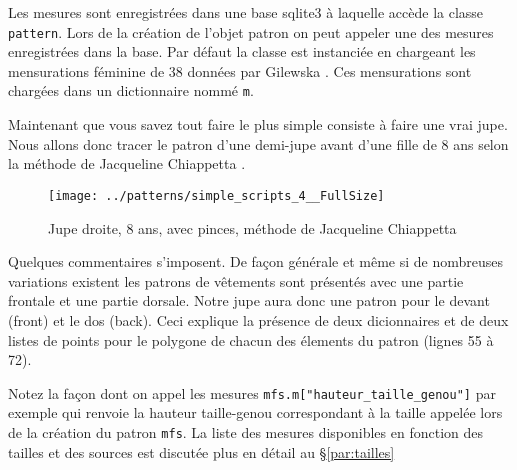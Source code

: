 \documentclass[10pt,a4paper,twoside]{report}
\begin{document}
Les mesures sont enregistrées dans une base sqlite3 à laquelle accède la classe \texttt{pattern}. Lors de la création de l'objet patron on peut appeler une des mesures enregistrées dans la base. Par défaut la classe est instanciée en chargeant les mensurations féminine de 38 données par Gilewska \cite{Gilewska1}. Ces mensurations sont chargées dans un dictionnaire nommé \texttt{m}.

Maintenant que vous savez tout faire le plus simple consiste à faire une vrai jupe. Nous allons donc tracer le patron d'une demi-jupe avant d'une fille de 8 ans selon la méthode de Jacqueline Chiappetta \cite{Chiappetta1999}.




\begin{figure}[tb]
\begin{center}
\texttt{[image: ../patterns/simple\_scripts\_4\_\_FullSize]}
\end{center}
\caption{Jupe droite, 8 ans, avec pinces, méthode de Jacqueline Chiappetta}
\label{fig:trapeze}
\end{figure}

Quelques commentaires s'imposent. De façon générale et même si de nombreuses variations existent les patrons de vêtements sont présentés avec une partie frontale et une partie dorsale. Notre jupe aura donc une patron pour le devant (front) et le dos (back). Ceci explique la présence de deux dicionnaires et de deux listes de points pour le polygone de chacun des élements du patron (lignes 55 à 72).

Notez la façon dont on appel les mesures \texttt{mfs.m["hauteur\_taille\_genou"]} par exemple qui renvoie la hauteur taille-genou correspondant à la taille appelée lors de la création du patron \texttt{mfs}. La liste des mesures disponibles en fonction des tailles et des sources est discutée plus en détail au \S\ref{par:tailles}
\end{document}
